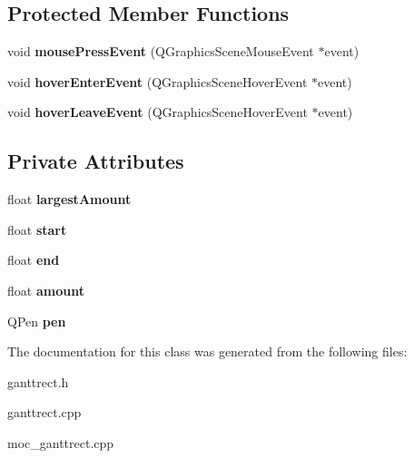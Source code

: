 \subsection*{Protected Member Functions}
\begin{DoxyCompactItemize}
\item 
\hypertarget{class_gantt_rect_a86e51a147edf6df229f1aad0a5089481}{}void {\bfseries mouse\+Press\+Event} (Q\+Graphics\+Scene\+Mouse\+Event $\ast$event)\label{class_gantt_rect_a86e51a147edf6df229f1aad0a5089481}

\item 
\hypertarget{class_gantt_rect_ad98eae638288375964942f34c4d315de}{}void {\bfseries hover\+Enter\+Event} (Q\+Graphics\+Scene\+Hover\+Event $\ast$event)\label{class_gantt_rect_ad98eae638288375964942f34c4d315de}

\item 
\hypertarget{class_gantt_rect_a3b2e69fe42463cedddb5e3cd8c2a88b1}{}void {\bfseries hover\+Leave\+Event} (Q\+Graphics\+Scene\+Hover\+Event $\ast$event)\label{class_gantt_rect_a3b2e69fe42463cedddb5e3cd8c2a88b1}

\end{DoxyCompactItemize}
\subsection*{Private Attributes}
\begin{DoxyCompactItemize}
\item 
\hypertarget{class_gantt_rect_a87c303488aa50b2b26dacc4641a50ccb}{}float {\bfseries largest\+Amount}\label{class_gantt_rect_a87c303488aa50b2b26dacc4641a50ccb}

\item 
\hypertarget{class_gantt_rect_a0146f1175f8a38f825f7bc0dd9ead993}{}float {\bfseries start}\label{class_gantt_rect_a0146f1175f8a38f825f7bc0dd9ead993}

\item 
\hypertarget{class_gantt_rect_aa730838f983a964aecd07f1888703841}{}float {\bfseries end}\label{class_gantt_rect_aa730838f983a964aecd07f1888703841}

\item 
\hypertarget{class_gantt_rect_a49e581012b987f5038403b25427dabe7}{}float {\bfseries amount}\label{class_gantt_rect_a49e581012b987f5038403b25427dabe7}

\item 
\hypertarget{class_gantt_rect_a6ed153f381b086ad680e83da17662886}{}Q\+Pen {\bfseries pen}\label{class_gantt_rect_a6ed153f381b086ad680e83da17662886}

\end{DoxyCompactItemize}


The documentation for this class was generated from the following files\+:\begin{DoxyCompactItemize}
\item 
ganttrect.\+h\item 
ganttrect.\+cpp\item 
moc\+\_\+ganttrect.\+cpp\end{DoxyCompactItemize}
